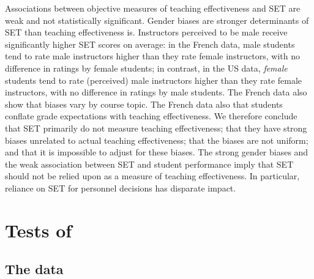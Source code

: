 \documentclass[12pt]{article}
\begin{document}
Associations between objective measures of teaching effectiveness and SET are weak
and not statistically significant.
Gender biases are stronger determinants of SET than teaching effectiveness is.
Instructors perceived to be male receive significantly higher SET scores on average:
in the French data, male students tend to rate male instructors higher
than they rate female instructors, with no difference in ratings by female students;
in contrast, in the US data, \emph{female} students tend to rate (perceived) male instructors 
higher than they rate female instructors, with no difference in ratings by male students. 
The French data also show that biases vary by course topic. 
The French data also that students conflate grade expectations with teaching effectiveness.
We therefore conclude that SET primarily do not measure teaching effectiveness; that
they have strong biases unrelated to actual teaching effectiveness; that the biases are not uniform;
and that it is impossible to adjust for these biases. 
The strong gender biases and the weak association between SET and student performance
imply that SET should not be relied upon as a measure of teaching effectiveness.
In particular, reliance on SET for personnel decisions has disparate impact. 

\section{Tests of \citet{Boring2015}}

\subsection{The data}
\end{document}
